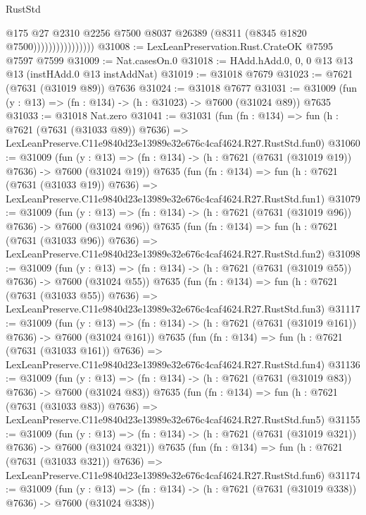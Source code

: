 \begin{lexlean}{RustStd}
\begin{coremodule}
                                @175
                                @27
                                @2310
                                @2256
                                @7500
                                @8037
                                @26389
                                (@8311 (@8345 @1820 @7500))))))))))))))))
@31008 := LexLeanPreservation.Rust.CrateOK @7595 @7597 @7599
@31009 := Nat.casesOn.{0}
@31018 := HAdd.hAdd.{0, 0, 0} @13 @13 @13 (instHAdd.{0} @13 instAddNat)
@31019 := @31018 @7679
@31023 := @7621 (@7631 (@31019 @89)) @7636
@31024 := @31018 @7677
@31031 := @31009 (fun (y : @13) => (fn : @134) -> (h : @31023) -> @7600 (@31024 @89)) @7635
@31033 := @31018 Nat.zero
@31041 := @31031
    (fun (fn : @134) =>
    fun (h : @7621 (@7631 (@31033 @89)) @7636) =>
    LexLeanPreserve.C11e9840d23e13989e32e676c4caf4624.R27.RustStd.fun0)
@31060 := @31009
    (fun (y : @13) => (fn : @134) -> (h : @7621 (@7631 (@31019 @19)) @7636) -> @7600 (@31024 @19))
    @7635
    (fun (fn : @134) =>
    fun (h : @7621 (@7631 (@31033 @19)) @7636) =>
    LexLeanPreserve.C11e9840d23e13989e32e676c4caf4624.R27.RustStd.fun1)
@31079 := @31009
    (fun (y : @13) => (fn : @134) -> (h : @7621 (@7631 (@31019 @96)) @7636) -> @7600 (@31024 @96))
    @7635
    (fun (fn : @134) =>
    fun (h : @7621 (@7631 (@31033 @96)) @7636) =>
    LexLeanPreserve.C11e9840d23e13989e32e676c4caf4624.R27.RustStd.fun2)
@31098 := @31009
    (fun (y : @13) => (fn : @134) -> (h : @7621 (@7631 (@31019 @55)) @7636) -> @7600 (@31024 @55))
    @7635
    (fun (fn : @134) =>
    fun (h : @7621 (@7631 (@31033 @55)) @7636) =>
    LexLeanPreserve.C11e9840d23e13989e32e676c4caf4624.R27.RustStd.fun3)
@31117 := @31009
    (fun (y : @13) => (fn : @134) -> (h : @7621 (@7631 (@31019 @161)) @7636) -> @7600 (@31024 @161))
    @7635
    (fun (fn : @134) =>
    fun (h : @7621 (@7631 (@31033 @161)) @7636) =>
    LexLeanPreserve.C11e9840d23e13989e32e676c4caf4624.R27.RustStd.fun4)
@31136 := @31009
    (fun (y : @13) => (fn : @134) -> (h : @7621 (@7631 (@31019 @83)) @7636) -> @7600 (@31024 @83))
    @7635
    (fun (fn : @134) =>
    fun (h : @7621 (@7631 (@31033 @83)) @7636) =>
    LexLeanPreserve.C11e9840d23e13989e32e676c4caf4624.R27.RustStd.fun5)
@31155 := @31009
    (fun (y : @13) => (fn : @134) -> (h : @7621 (@7631 (@31019 @321)) @7636) -> @7600 (@31024 @321))
    @7635
    (fun (fn : @134) =>
    fun (h : @7621 (@7631 (@31033 @321)) @7636) =>
    LexLeanPreserve.C11e9840d23e13989e32e676c4caf4624.R27.RustStd.fun6)
@31174 := @31009
    (fun (y : @13) => (fn : @134) -> (h : @7621 (@7631 (@31019 @338)) @7636) -> @7600 (@31024 @338))

\end{coremodule}
\end{lexlean}

